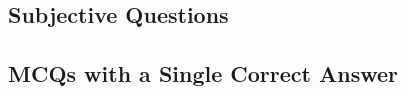 \subsection*{Subjective Questions}
\begin{enumerate}[label=\thechapter.\arabic*,ref=\thechapter.\theenumi]




\end{enumerate}
\subsection*{MCQs with a Single Correct Answer}
\begin{enumerate}[label=\thechapter.\arabic*,ref=\thechapter.\theenumi]




\end{enumerate}
